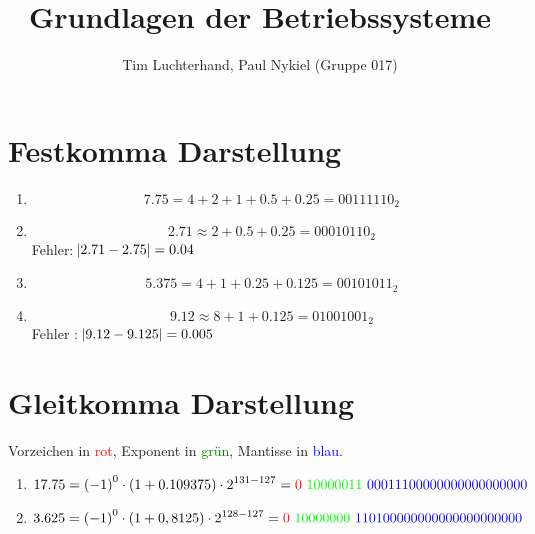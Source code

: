\documentclass[DIN, pagenumber=false, fontsize=11pt, parskip=half]{scrartcl}
\title{Grundlagen der Betriebssysteme}
\author{Tim Luchterhand, Paul Nykiel (Gruppe 017)}
\begin{document}
    \maketitle
    \section{Festkomma Darstellung}
    \begin{enumerate}[label=(\alph*)]
        \item 
            \begin{equation*}
                7.75 = 4 + 2 + 1 + 0.5 + 0.25 = {00111110}_2
            \end{equation*}
        \item
            \begin{equation*}
                2.71 \approx 2 + 0.5 + 0.25 = {00010110}_2
            \end{equation*}
            Fehler: $\abs{2.71 - 2.75} = 0.04$
        \item
            \begin{equation*}
                5.375 = 4 + 1 + 0.25 + 0.125 = {00101011}_2
            \end{equation*}
        \item
            \begin{equation*}
                9.12 \approx 8 + 1 + 0.125 = {01001001}_2
            \end{equation*}
            Fehler : $\abs{9.12 - 9.125} = 0.005$
    \end{enumerate}
    \section{Gleitkomma Darstellung}
    Vorzeichen in \textcolor{red}{rot}, Exponent in \textcolor{green}{grün}, Mantisse in \textcolor{blue}{blau}.
    \begin{enumerate}[label = (\alph*)]
        \item
            \begin{equation*}
                17.75 = {(-1)}^0 \cdot (1+0.109375) \cdot 2^{131-127} = \textcolor{red}{0}\ \textcolor{green}{10000011}\ \textcolor{blue}{00011100000000000000000}
            \end{equation*}
        \item 
            \begin{equation*}
                3.625 = {(-1)}^0 \cdot (1+0,8125) \cdot 2^{128 - 127} = \textcolor{red}{0}\ \textcolor{green}{10000000}\ \textcolor{blue}{110100000000000000000000}
            \end{equation*}
    \end{enumerate}
\end{document}
